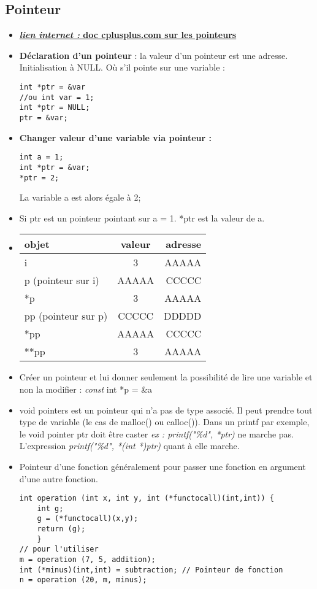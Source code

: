 \documentclass[12pt,a4paper]{article}
\begin{document}
\subsection{Pointeur}
\begin{itemize}
\item \href{http://www.cplusplus.com/doc/tutorial/pointers/}{\textbf{\textit{lien internet : }doc cplusplus.com sur les pointeurs}}
\item \textbf{Déclaration d'un pointeur} : la valeur d'un pointeur est une adresse. 
Initialisation à NULL.
Où s'il pointe sur une variable : 
\begin{lstlisting}
int *ptr = &var
//ou int var = 1; 
int *ptr = NULL; 
ptr = &var;
\end{lstlisting}
\item \textbf{Changer valeur d'une variable via pointeur : } 
\begin{lstlisting}
int a = 1; 
int *ptr = &var;
*ptr = 2;
\end{lstlisting}
La variable a est alors égale à 2;
\item Si ptr est un pointeur pointant sur a = 1. *ptr est la valeur de a.
\item \begin{tabular}{|l|c|r|}
  \hline
  objet & valeur & adresse \\
  \hline \hline
  i & 3 & AAAAA \\ \hline
  p (pointeur sur i) & AAAAA & CCCCC \\ \hline
  *p & 3 & AAAAA \\ \hline
  pp (pointeur sur p) & CCCCC & DDDDD \\ \hline
  *pp & AAAAA & CCCCC \\ \hline
  **pp & 3 & AAAAA \\ \hline
\end{tabular}
\item Créer un pointeur et lui donner seulement la possibilité de lire une variable et non la modifier : \textit{const} int *p = \&a
\item void pointers est un pointeur qui n'a pas de type associé. Il peut prendre tout type de variable (le cas de malloc() ou calloc()). Dans un printf par exemple, le void pointer ptr doit être caster \textit{ex : printf("\%d", *ptr)} ne marche pas. L'expression \textit{printf("\%d", *(int *)ptr)} quant à elle marche.
\item Pointeur d'une fonction généralement pour passer une fonction en argument d'une autre fonction.
\begin{lstlisting}
int operation (int x, int y, int (*functocall)(int,int)) {
	int g;
	g = (*functocall)(x,y);
	return (g); 
	}
// pour l'utiliser
m = operation (7, 5, addition);
int (*minus)(int,int) = subtraction; // Pointeur de fonction 
n = operation (20, m, minus);
\end{lstlisting}
\end{itemize}
\end{document}
